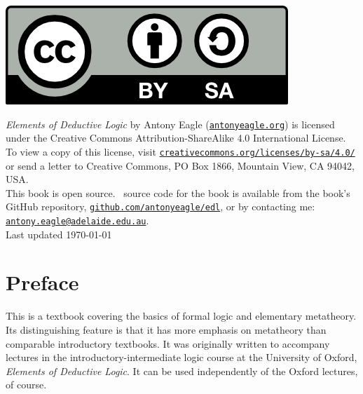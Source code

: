 \documentclass[openany,leqno,11pt]{book}
\theoremstyle{break}
\theoremstyle{definition}
\theoremstyle{remark}
\begin{document}
\thispagestyle{empty}
\vspace{2cm}
\begin{center}
    
	\includegraphics{by-sa.png} \vspace{1cm}



{\small    	\emph{Elements of Deductive Logic} by Antony Eagle (\href{http://antonyeagle.org}{\nolinkurl{antonyeagle.org}}) is	licensed under the Creative Commons Attribution-ShareAlike 4.0 International License.\\[1cm]

To view a copy of this license, visit \href{http://creativecommons.org/licenses/by-sa/4.0/}{\nolinkurl{creativecommons.org/licenses/by-sa/4.0/}} or send a letter to Creative Commons, PO Box 1866, Mountain View, CA 94042, USA.\\[1cm]

This book is open source. \XeLaTeX\ source code for the book is available from the book's GitHub repository, \href{https://github.com/antonyeagle/edl}{\nolinkurl{github.com/antonyeagle/edl}}, or by contacting me: \href{mailto:antony.eagle@adelaide.edu.au}{\nolinkurl{antony.eagle@adelaide.edu.au}}.\\[4cm]

    Last updated  \today\\[1cm]
    


}

\end{center}


\pagestyle{fancy}

\chapter*{Preface}

This is a textbook covering the basics of formal logic and elementary metatheory. Its distinguishing feature is that it has more emphasis on metatheory than comparable introductory textbooks. It was originally written to accompany lectures in the introductory-intermediate logic course at the University of Oxford, \emph{Elements of Deductive Logic}. It can be used independently of the Oxford lectures, of course. 
\end{document}
